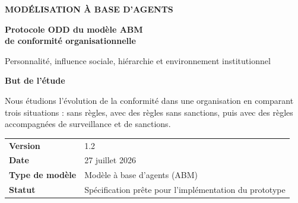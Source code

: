 \documentclass[11pt,a4paper]{article}
\begin{document}
\hypersetup{pageanchor=false}
\begin{titlepage}
\thispagestyle{empty}

\vspace*{17mm}
{\sffamily\small\bfseries\color{Gold}\MakeUppercase{Modélisation à base d’agents}\par}
\vspace{5mm}
{\sffamily\fontsize{28}{33}\selectfont\bfseries\color{white}
Protocole ODD du modèle ABM\\[1mm]
de conformité organisationnelle\par}
\vspace{7mm}
{\sffamily\large\color{white}
Personnalité, influence sociale, hiérarchie et environnement institutionnel\par}

\vspace{42mm}
\begin{tcolorbox}[
  width=\textwidth,
  colback=white,
  colframe=Rule,
  boxrule=0.8pt,
  arc=2mm,
  left=6mm,right=6mm,top=5mm,bottom=5mm]
{\sffamily\bfseries\color{Navy}But de l’étude}\par
\vspace{1mm}
Nous étudions l’évolution de la conformité dans une organisation en comparant
trois situations : sans règles, avec des règles sans sanctions, puis avec des
règles accompagnées de surveillance et de sanctions.
\end{tcolorbox}

\vfill
\begin{tabularx}{\textwidth}{@{}L{36mm}Y@{}}
\sffamily\bfseries\color{Navy}Version & 1.2\\
\sffamily\bfseries\color{Navy}Date & 27 juillet 2026\\
\sffamily\bfseries\color{Navy}Type de modèle & Modèle à base d’agents (ABM)\\
\sffamily\bfseries\color{Navy}Statut & Spécification prête pour l’implémentation du prototype\\
\end{tabularx}
\end{titlepage}
\end{document}
